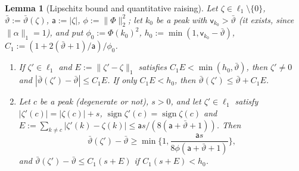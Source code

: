 \documentclass[10pt]{amsart}
\newtheorem{lemma}[theorem]{Lemma}
\theoremstyle{definition}
\theoremstyle{remark}
\newcommand{\sgn}{\operatorname{sign}}
\begin{document}
\begin{lemma}[Lipschitz bound and quantitative raising]\label{lem:II-T2}
Let $\zeta\in\ell_1\setminus\{0\}$, $\bar\vartheta:=\bar\vartheta(\zeta)$,
$\mathsf a:=|\zeta|$, $\phi:=\|\Phi\|_2^2$; let $k_0$ be a peak with $\mathsf
v_{k_0}>\bar\vartheta$ \textup{(}it exists, since $\|\alpha\|_1=1$\textup{)},
and put $\phi_0:=\Phi(k_0)^2$, $h_0:=\min(1,\mathsf v_{k_0}-\bar\vartheta)$,
$C_1:=(1+2(\bar\vartheta+1)/\mathsf a)/\phi_0$.
\begin{enumerate}
\item[(a)] If $\zeta'\in\ell_1$ and $E:=\|\zeta'-\zeta\|_1$ satisfies
$C_1E<\min(h_0,\bar\vartheta)$, then $\zeta'\ne0$ and
$|\bar\vartheta(\zeta')-\bar\vartheta|\le C_1E$.  If only $C_1E<h_0$, then
$\bar\vartheta(\zeta')\le\bar\vartheta+C_1E$.
\item[(b)] Let $c$ be a peak \textup{(}degenerate or not\textup{)}, $s>0$,
and let $\zeta'\in\ell_1$ satisfy $|\zeta'(c)|=|\zeta(c)|+s$,
$\sgn\zeta'(c)=\sgn\zeta(c)$ and $E:=\sum_{k\ne c}|\zeta'(k)-\zeta(k)|\le
\mathsf as/(8(\mathsf a+\bar\vartheta+1))$.  Then
\[
 \bar\vartheta(\zeta')-\bar\vartheta\ge\min\Big\{1,\frac{\mathsf a s}{8\phi
 (\mathsf a+\bar\vartheta+1)}\Big\},
\]
and $\bar\vartheta(\zeta')-\bar\vartheta\le C_1(s+E)$ if $C_1(s+E)<h_0$.
\end{enumerate}
\end{lemma}
\end{document}
